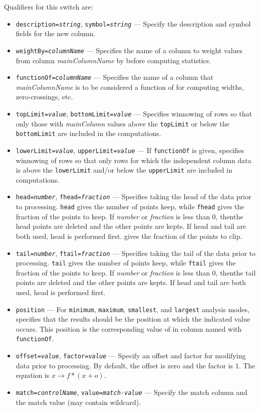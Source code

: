 \begin{itemize}
\begin{itemize}
\begin{itemize}
Qualifiers for this switch are:
\begin{itemize}
\item {\tt description={\em string}}, {\tt symbol={\em string}} --- Specify the description and symbol
fields for the new column.
\item {\tt weightBy={\em columnName}} --- Specifies the name of a column to weight values from 
column {\em mainColumnName} by before computing statistics.
\item {\tt functionOf={\em columnName}} --- Specifies the name of a column that {\em mainColumnName}
is to be considered a function of for computing widths, zero-crossings, etc.
\item {\tt topLimit={\em value}}, {\tt bottomLimit={\em value}} --- Specifies winnowing of rows
so that only those with {\em mainColumn} values above the {\tt topLimit} or below the {\tt bottomLimit} are 
included in the computations.
\item {\tt lowerLimit={\em value}}, {\tt upperLimit={\em value}} --- If {\tt functionOf} is given,
specifies winnowing of rows so that only rows for which the independent column data is above
the {\tt lowerLimit} and/or below the {\tt upperLimit} are included in computations.
\item {\tt head={\em number}}, {\tt fhead={\em fraction}} --- Specifies taking the head 
of the data prior to processing.  {\tt head} gives the number of points keep, while {\tt fhead}
gives the fraction of the points to keep.  If {\em number} or {\em fraction} is less than 0, thenthe head points are deleted and the other points are kepts. If head and tail are both used, head  is
performed first.
gives the fraction of the points to clip.
\item {\tt tail={\em number}}, {\tt ftail={\em fraction}} --- Specifies taking the tail 
of the data prior to processing.  {\tt tail} gives the number of points keep, while {\tt ftail}
gives the fraction of the points to keep.  If {\em number} or {\em fraction} is less than 0, thenthe tail points are deleted and the other points are kepts. If head and tail are both used, head  is
performed first.
\item {\tt position} --- For {\tt minimum}, {\tt maximum}, {\tt smallest}, and {\tt largest} analysis modes,
specifies that the results should be the position at which the indicated value occurs.  This position is
the corresponding value of in column named with {\tt functionOf}.
\item {\tt offset={\em value}}, {\tt factor={\em value}} --- Specify an offset and factor for modifying
data prior to processing.  By default, the offset is zero and the factor is 1.  The equation is
$x \rightarrow f*(x+o) $.
\item {\tt match={\em controlName}}, {\tt value={\em match-value}} --- Specify the match column and the
match value (may contain wildcard).
\end{itemize}



\end{itemize}
\end{itemize}
\end{itemize}
